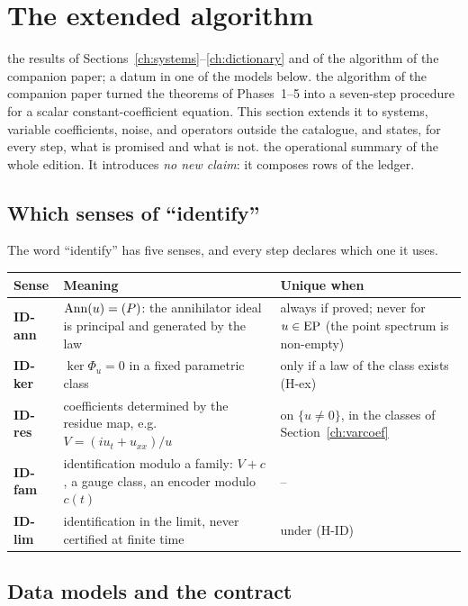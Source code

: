\section{The extended algorithm}\label{ch:extalgo}
\sectionbrief
{the results of Sections~\ref{ch:systems}--\ref{ch:dictionary} and of the algorithm of the companion paper; a datum in one of the models below.}
{the algorithm of the companion paper turned the theorems of Phases~1--5 into a seven-step procedure for a scalar constant-coefficient equation. This section extends it to systems, variable coefficients, noise, and operators outside the catalogue, and states, for every step, what is promised and what is not.}
{the operational summary of the whole edition. It introduces \emph{no new claim}: it composes rows of the ledger.}

\subsection{Which senses of ``identify''}

The word ``identify'' has five senses, and every step declares which one it uses.

\begin{center}\small
\begin{tabular}{@{}L{1.7cm}L{7.3cm}L{5.4cm}@{}}
\toprule
Sense & Meaning & Unique when\\\midrule
\textbf{ID-ann} & $\operatorname{Ann}(u)=(P)$: the annihilator ideal is principal and generated by the law & always if proved; never for $u\in\mathrm{EP}$ (the point spectrum is non-empty)\\
\textbf{ID-ker} & $\ker\Phi_u=0$ in a fixed parametric class & only if a law of the class exists (H-ex)\\
\textbf{ID-res} & coefficients determined by the residue map, e.g.\ $V=(iu_t+u_{xx})/u$ & on $\{u\ne0\}$, in the classes of Section~\ref{ch:varcoef}\\
\textbf{ID-fam} & identification modulo a family: $V+c$, a gauge class, an encoder modulo $c(t)$ & --\\
\textbf{ID-lim} & identification in the limit, never certified at finite time & under (H-ID)\\\bottomrule
\end{tabular}
\end{center}

\subsection{Data models and the contract}

